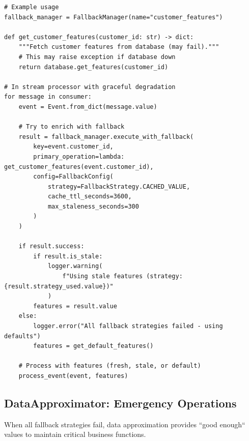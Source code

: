 \begin{lstlisting}[style=python, caption={Fallback Manager for Graceful Degradation}]
# Example usage
fallback_manager = FallbackManager(name="customer_features")

def get_customer_features(customer_id: str) -> dict:
    """Fetch customer features from database (may fail)."""
    # This may raise exception if database down
    return database.get_features(customer_id)

# In stream processor with graceful degradation
for message in consumer:
    event = Event.from_dict(message.value)

    # Try to enrich with fallback
    result = fallback_manager.execute_with_fallback(
        key=event.customer_id,
        primary_operation=lambda: get_customer_features(event.customer_id),
        config=FallbackConfig(
            strategy=FallbackStrategy.CACHED_VALUE,
            cache_ttl_seconds=3600,
            max_staleness_seconds=300
        )
    )

    if result.success:
        if result.is_stale:
            logger.warning(
                f"Using stale features (strategy: {result.strategy_used.value})"
            )
        features = result.value
    else:
        logger.error("All fallback strategies failed - using defaults")
        features = get_default_features()

    # Process with features (fresh, stale, or default)
    process_event(event, features)
\end{lstlisting}

\subsection{DataApproximator: Emergency Operations}

When all fallback strategies fail, data approximation provides ``good enough`` values to maintain critical business functions.

